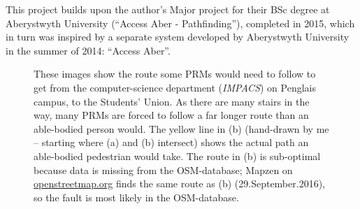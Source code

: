 This project builds upon the author's Major project for their BSc degree at Aberystwyth University (\textquotedblleft Access Aber - Pathfinding\textquotedblright), completed in 2015, which in turn was inspired by a separate system developed by Aberystwyth University in the summer of 2014: \textquotedblleft Access Aber\textquotedblright.

\begin{figure}
	\centering
	
	
	
	\caption[Longer routes for Persons with Reduced Mobility]{These images show the route some PRMs would need to follow to get from the computer-science department (\textit{IMPACS}) on Penglais campus, to the Students' Union. As there are many stairs in the way, many PRMs are forced to follow a far longer route than an able-bodied person would. The yellow line in (b) (hand-drawn by me -- starting where (a) and (b) intersect) shows the actual path an able-bodied pedestrian would take. The route in (b) is sub-optimal because data is missing from the OSM-database; Mapzen on \url{openstreetmap.org} finds the same route as (b) (29.September.2016), so the fault is most likely in the OSM-database.}
	\label{fig:longerRoutePRM}
\end{figure}

